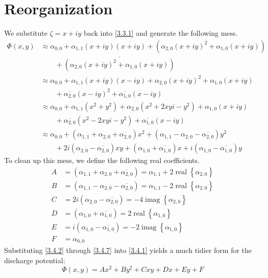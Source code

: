 \documentclass[12pt]{report}
\providecommand{\imag}[1]{\operatorname{imag}\!\left\{#1\right\}}
\providecommand{\real}[1]{\operatorname{real}\!\left\{#1\right\}}
\begin{document}
\section{Reorganization}
We substitute $\zeta = x + iy$ back into \eqref{3.3.1} and generate the following mess.
%
\begin{align}
    \Phi(x,y)
        &\approx
        \alpha_{0,0} + \alpha_{1,1} (x + iy)\overline{(x + iy)} + \left( \alpha_{2,0} (x + iy)^2 + \alpha_{1,0} (x + iy) \right) \nonumber\\
        &\qquad+
        \overline{\left( \alpha_{2,0} (x + iy)^2 + \alpha_{1,0} (x + iy) \right)} \\
        &\approx
        \alpha_{0,0} + \alpha_{1,1} (x + iy)(x - iy) + \alpha_{2,0} (x + iy)^2 + \alpha_{1,0} (x + iy) \nonumber\\
        &\qquad+
        \overline{\alpha_{2,0}} (x - iy)^2 + \overline{\alpha_{1,0}} (x - iy) \\
        &\approx
        \alpha_{0,0} + \alpha_{1,1} (x^2 + y^2) + \alpha_{2,0} (x^2 + 2xyi - y^2) + \alpha_{1,0} (x + iy) \nonumber\\
        &\qquad+
        \overline{\alpha_{2,0}} (x^2 - 2xyi - y^2) + \overline{\alpha_{1,0}} (x - iy) \\
        &\approx
        \alpha_{0,0}
        + \left( \alpha_{1,1} + \alpha_{2,0} + \overline{\alpha_{2,0}} \right) x^2
        + \left( \alpha_{1,1} - \alpha_{2,0} - \overline{\alpha_{2,0}} \right) y^2 \nonumber\\
        &\qquad+
        2i \left( \alpha_{2,0} - \overline{\alpha_{2,0}} \right) xy
        + \left( \alpha_{1,0} + \overline{\alpha_{1,0}} \right) x
        + i \left( \alpha_{1,0} - \overline{\alpha_{1,0}} \right) y \label{3.4.1}
\end{align}
%
To clean up this mess, we define the following real coefficients.
%
\begin{align}
    A &= \left( \alpha_{1,1} + \alpha_{2,0} + \overline{\alpha_{2,0}} \right) = \alpha_{1,1} + 2 \real{\alpha_{2,0}} \label{3.4.2}\\
    B &= \left( \alpha_{1,1} - \alpha_{2,0} - \overline{\alpha_{2,0}} \right) = \alpha_{1,1} - 2 \real{\alpha_{2,0}} \label{3.4.3}\\
    C &= 2i \left( \alpha_{2,0} - \overline{\alpha_{2,0}} \right) = -4 \imag{\alpha_{2,0}} \label{3.4.4}\\
    D &= \left( \alpha_{1,0} + \overline{\alpha_{1,0}} \right) = 2 \real{\alpha_{1,0}} \label{3.4.5}\\
    E &= i \left( \alpha_{1,0} - \overline{\alpha_{1,0}} \right) = -2 \imag{\alpha_{1,0}} \label{3.4.6}\\
    F &= \alpha_{0,0} \label{3.4.7}
\end{align}
%
Substituting \eqref{3.4.2} through \eqref{3.4.7} into \eqref{3.4.1} yields a much tidier form for the discharge potential:
%
\begin{equation} \label{3.4.8}
\boxed{
    \Phi(x,y) = Ax^2 + By^2 + Cxy + Dx + Ey + F
}
\end{equation}
\end{document}

